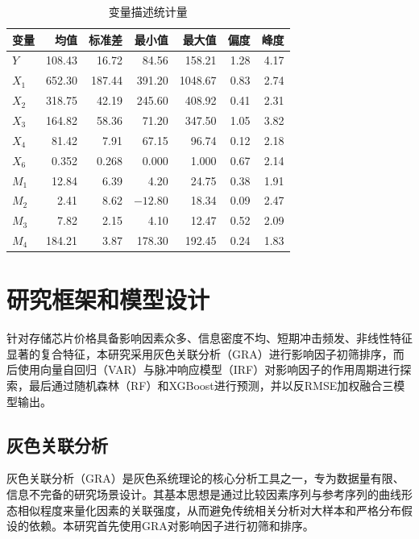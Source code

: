 \documentclass[a4paper,12pt,fontset=fandol]{ctexart}
\begin{document}
\begin{table}[H]
\centering
\renewcommand{\arraystretch}{1.15}
\footnotesize
\begin{tabular}{lrrrrrr}
\toprule
变量 & 均值 & 标准差 & 最小值 & 最大值 & 偏度 & 峰度 \\
\midrule
$Y$ & 108.43 & 16.72 & 84.56 & 158.21 & 1.28 & 4.17 \\
$X_1$ & 652.30 & 187.44 & 391.20 & 1048.67 & 0.83 & 2.74 \\
$X_2$ & 318.75 & 42.19 & 245.60 & 408.92 & 0.41 & 2.31 \\
$X_3$ & 164.82 & 58.36 & 71.20 & 347.50 & 1.05 & 3.82 \\
$X_4$ & 81.42 & 7.91 & 67.15 & 96.74 & 0.12 & 2.18 \\
$X_6$ & 0.352 & 0.268 & 0.000 & 1.000 & 0.67 & 2.14 \\
$M_1$ & 12.84 & 6.39 & 4.20 & 24.75 & 0.38 & 1.91 \\
$M_2$ & 2.41 & 8.62 & $-12.80$ & 18.34 & 0.09 & 2.47 \\
$M_3$ & 7.82 & 2.15 & 4.10 & 12.47 & 0.52 & 2.09 \\
$M_4$ & 184.21 & 3.87 & 178.30 & 192.45 & 0.24 & 1.83 \\
\bottomrule
\end{tabular}
\caption{变量描述统计量}
\label{tab:descriptive}
\end{table}


\section{研究框架和模型设计}

针对存储芯片价格具备影响因素众多、信息密度不均、短期冲击频发、非线性特征显著的复合特征，本研究采用灰色关联分析（GRA）进行影响因子初筛排序，而后使用向量自回归（VAR）与脉冲响应模型（IRF）对影响因子的作用周期进行探索，最后通过随机森林（RF）和XGBoost进行预测，并以反RMSE加权融合三模型输出。

\subsection{灰色关联分析}

灰色关联分析（GRA）是灰色系统理论的核心分析工具之一，专为数据量有限、信息不完备的研究场景设计\cite{deng1982}。其基本思想是通过比较因素序列与参考序列的曲线形态相似程度来量化因素的关联强度，从而避免传统相关分析对大样本和严格分布假设的依赖。本研究首先使用GRA对影响因子进行初筛和排序。
\end{document}
